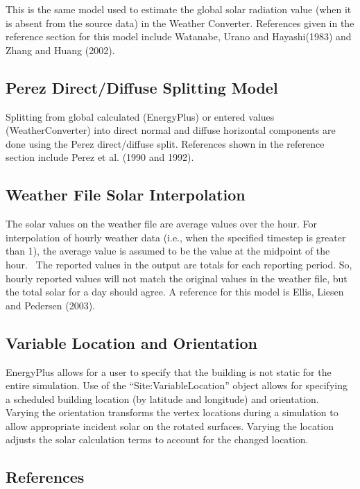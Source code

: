 This is the same model used to estimate the global solar radiation value (when it is absent from the source data) in the Weather Converter. References given in the reference section for this model include Watanabe, Urano and Hayashi(1983) and Zhang and Huang (2002).

\subsection{Perez Direct/Diffuse Splitting Model}\label{perez-directdiffuse-splitting-model}

Splitting from global calculated (EnergyPlus) or entered values (WeatherConverter) into direct normal and diffuse horizontal components are done using the Perez direct/diffuse split. References shown in the reference section include Perez et al. (1990 and 1992).

\subsection{Weather File Solar Interpolation}\label{weather-file-solar-interpolation}

The solar values on the weather file are average values over the hour. For interpolation of hourly weather data (i.e., when the specified timestep is greater than 1), the average value is assumed to be the value at the midpoint of the hour.~ The reported values in the output are totals for each reporting period. So, hourly reported values will not match the original values in the weather file, but the total solar for a day should agree. A reference for this model is Ellis, Liesen and Pedersen (2003).

\subsection{Variable Location and Orientation}\label{variable-location-orientation}

EnergyPlus allows for a user to specify that the building is not static for the entire simulation.
Use of the ``Site:VariableLocation'' object allows for specifying a scheduled building location (by latitude and longitude) and orientation.
Varying the orientation transforms the vertex locations during a simulation to allow appropriate incident solar on the rotated surfaces.
Varying the location adjusts the solar calculation terms to account for the changed location.

\subsection{References}\label{references-010}

